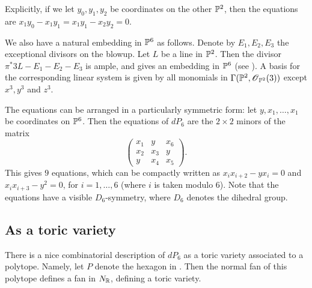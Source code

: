 \documentclass[11pt, english]{book}
\begin{document}
Explicitly, if we let $y_0,y_1,y_2$ be coordinates on the other $\mathbb{P}^2$, then the equations are $x_1y_0-x_1y_1=x_1y_1-x_2y_2=0$.

We also have a natural embedding in $\mathbb{P}^6$ as follows. Denote by $E_1, E_2, E_3$ the exceptional divisors on the blowup. Let $L$ be a line in $\mathbb{P}^2$. Then the divisor $\pi^\ast 3L - E_1-E_2-E_3$ is ample, and gives an embedding in $\mathbb{P}^6$ (see \cite[Chapter V, Theorem 4.6]{hartshorne}). A basis for the corresponding linear system is given by all monomials in $\Gamma(\mathbb{P}^2,\operatorname{\mathscr{O}}_{\mathbb{P}^2}(3))$ except $x^3,y^3$ and $z^3$. 

The equations can be arranged in a particularly symmetric form: let $y,x_1,\ldots,x_1$ be coordinates on $\mathbb{P}^6$. Then the equations of $dP_6$ are the $2 \times 2$ minors of the matrix
$$
\begin{pmatrix}
x_1 & y & x_6 \\
x_2 & x_3 & y \\
y & x_4 & x_5
\end{pmatrix}.
$$
This gives $9$ equations, which can be compactly written as $x_ix_{i+2}-yx_i=0$ and $x_ix_{i+3}-y^2=0$, for $i=1,\ldots,6$ (where $i$ is taken modulo $6$). Note that the equations have a visible $D_6$-symmetry, where $D_6$ denotes the dihedral group.

\subsection{As a toric variety}

There is a nice combinatorial description of $dP_6$ as a toric variety associated to a polytope. Namely, let $P$ denote the hexagon in . Then the normal fan of this polytope defines a fan in $N_{\mathbb{R}}$, defining a toric variety.
\end{document}
